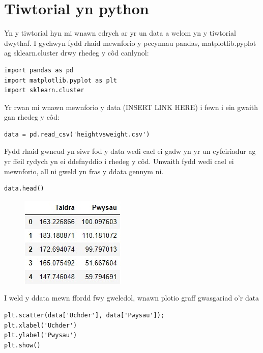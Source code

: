 

\section{Tiwtorial yn python}
Yn y tiwtorial hyn mi wnawn edrych ar yr un data a welom yn y tiwtorial dwythaf.
I gychwyn fydd rhaid mewnforio y pecynnau pandas, matplotlib.pyplot ag sklearn.cluster drwy rhedeg y c\^{o}d canlynol:

\begin{verbatim}
import pandas as pd
import matplotlib.pyplot as plt
import sklearn.cluster
\end{verbatim}

Yr rwan mi wnawn mewnforio y data (INSERT LINK HERE) i fewn i ein gwaith gan rhedeg y c\^{o}d:
\begin{verbatim}
data = pd.read_csv('heightvsweight.csv')
\end{verbatim}
Fydd rhaid gwneud yn siwr fod y data wedi cael ei gadw yn yr un cyfeiriadur ag yr ffeil rydych yn ei ddefnyddio i rhedeg y c\^{o}d.
Unwaith fydd wedi cael ei mewnforio, all ni gweld yn fras y ddata gennym ni. 
\begin{verbatim}
data.head()
\end{verbatim}

\begin{figure}
\includegraphics[width=0.35\linewidth]{../img/tabl1.jpg}
\label{fig:Data1}
\end{figure}

I weld y ddata mewn ffordd fwy gweledol, wnawn plotio graff gwasgariad o'r data

\begin{verbatim}
plt.scatter(data['Uchder'], data['Pwysau']);
plt.xlabel('Uchder')
plt.ylabel('Pwysau')
plt.show()
\end{verbatim}

